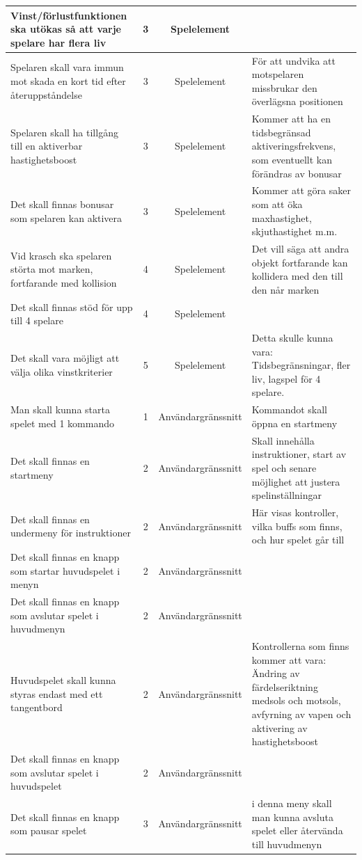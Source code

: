 \documentclass[12pt,a4paper]{article}
\begin{document}
\begin{longtable}{ | p{3.5cm} | c | c | p{3.5cm} | }
	Vinst/förlustfunktionen ska utökas så att varje spelare har flera liv & 3 & Spelelement & \\ \hline
	Spelaren skall vara immun mot skada en kort tid efter återuppståndelse & 3 & Spelelement & För att undvika att motspelaren missbrukar den överlägsna positionen\\ \hline
	Spelaren skall ha tillgång till en aktiverbar hastighetsboost & 3 & Spelelement & Kommer att ha en tidsbegränsad aktiveringsfrekvens, som eventuellt kan förändras av bonusar\\ \hline
	Det skall finnas bonusar som spelaren kan aktivera & 3 & Spelelement & Kommer att göra saker som att öka maxhastighet, skjuthastighet m.m.\\ \hline
	Vid krasch ska spelaren störta mot marken, fortfarande med kollision & 4 & Spelelement & Det vill säga att andra objekt fortfarande kan kollidera med den till den når marken\\ \hline
	Det skall finnas stöd för upp till 4 spelare & 4 & Spelelement & \\ \hline
	Det skall vara möjligt att välja olika vinstkriterier & 5 & Spelelement & Detta skulle kunna vara: Tidsbegränsningar, fler liv, lagspel för 4 spelare.\\ \hline
	Man skall kunna starta spelet med 1 kommando & 1 & Användargränssnitt & Kommandot skall öppna en startmeny\\ \hline
	Det skall finnas en startmeny & 2 & Användargränssnitt & Skall innehålla instruktioner, start av spel och senare möjlighet att justera spelinställningar\\ \hline
	Det skall finnas en undermeny för instruktioner & 2 & Användargränssnitt & Här visas kontroller, vilka buffs som finns, och hur spelet går till\\ \hline
	Det skall finnas en knapp som startar huvudspelet i menyn & 2 & Användargränssnitt & \\ \hline
	Det skall finnas en knapp som avslutar spelet i huvudmenyn & 2 & Användargränssnitt & \\ \hline
	Huvudspelet skall kunna styras endast med ett tangentbord & 2 & Användargränssnitt & Kontrollerna som finns kommer att vara: Ändring av färdelseriktning medsols och motsols, avfyrning av vapen och aktivering av hastighetsboost\\ \hline
	Det skall finnas en knapp som avslutar spelet i huvudspelet & 2 & Användargränssnitt & \\ \hline
	Det skall finnas en knapp som pausar spelet & 3 & Användargränssnitt & i denna meny skall man kunna avsluta spelet eller återvända till huvudmenyn\\ \hline

\end{longtable}
\end{document}

